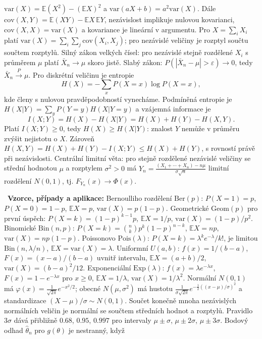 \begin{odpoved}
$\mathrm{var}(X)=\mathbb E(X^2)-(\mathbb EX)^2$ a
$\mathrm{var}(aX+b)=a^2\mathrm{var}(X)$. Dále
$\mathrm{cov}(X,Y)=\mathbb E(XY)-\mathbb EX\,\mathbb EY$, nezávislost implikuje nulovou
kovarianci, $\mathrm{cov}(X,X)=\mathrm{var}(X)$ a kovariance je lineární v argumentu.
Pro $X=\sum_iX_i$ platí
$\mathrm{var}(X)=\sum_i\sum_j\mathrm{cov}(X_i,X_j)$; pro nezávislé veličiny je rozptyl
součtu součtem rozptylů. Silný zákon velkých čísel: pro nezávislé stejně rozdělené
$X_i$ s průměrem $\mu$ platí $\bar X_n\to\mu$ skoro jistě. Slabý zákon:
$P(|\bar X_n-\mu|>\varepsilon)\to0$, tedy $\bar X_n\xrightarrow P\mu$. Pro diskrétní
veličinu je entropie
\[
H(X)=-\sum_x P(X=x)\log P(X=x),
\]
kde členy s nulovou pravděpodobností vynecháme. Podmíněná entropie je
$H(X|Y)=\sum_y P(Y=y)H(X|Y=y)$ a vzájemná informace je
\[
I(X;Y)=H(X)-H(X|Y)=H(X)+H(Y)-H(X,Y).
\]
Platí $I(X;Y)\ge0$, tedy $H(X)\ge H(X|Y)$: znalost $Y$ nemůže v průměru zvýšit
nejistotu o $X$. Zároveň $H(X,Y)=H(X)+H(Y)-I(X;Y)\le H(X)+H(Y)$, s rovností právě při
nezávislosti. Centrální limitní
věta: pro stejně rozdělené nezávislé veličiny se střední hodnotou $\mu$ a rozptylem
$\sigma^2>0$ má
$Y_n=\frac{(X_1+\cdots+X_n)-n\mu}{\sigma\sqrt n}$ limitní rozdělení $N(0,1)$, tj.
$F_{Y_n}(x)\to\Phi(x)$.\par
\noindent{}\ \textbf{Vzorce, případy a aplikace:} Bernoulliho rozdělení
$\mathrm{Ber}(p)$: $P(X=1)=p$, $P(X=0)=1-p$, $\mathbb EX=p$,
$\mathrm{var}(X)=p(1-p)$. Geometrické $\mathrm{Geom}(p)$ pro první úspěch:
$P(X=k)=(1-p)^{k-1}p$, $\mathbb EX=1/p$, $\mathrm{var}(X)=(1-p)/p^2$. Binomické
$\mathrm{Bin}(n,p)$: $P(X=k)=\binom nkp^k(1-p)^{n-k}$, $\mathbb EX=np$,
$\mathrm{var}(X)=np(1-p)$. Poissonovo $\mathrm{Pois}(\lambda)$:
$P(X=k)=\lambda^ke^{-\lambda}/k!$, je limitou $\mathrm{Bin}(n,\lambda/n)$,
$\mathbb EX=\mathrm{var}(X)=\lambda$. Uniformní $U(a,b)$:
$f(x)=1/(b-a)$, $F(x)=(x-a)/(b-a)$ uvnitř intervalu, $\mathbb EX=(a+b)/2$,
$\mathrm{var}(X)=(b-a)^2/12$. Exponenciální $\mathrm{Exp}(\lambda)$:
$f(x)=\lambda e^{-\lambda x}$, $F(x)=1-e^{-\lambda x}$ pro $x\ge0$,
$\mathbb EX=1/\lambda$, $\mathrm{var}(X)=1/\lambda^2$. Normální $N(0,1)$ má
$\varphi(x)=\frac1{\sqrt{2\pi}}e^{-x^2/2}$; obecné $N(\mu,\sigma^2)$ má hustotu
$\frac1{\sigma\sqrt{2\pi}}e^{-\frac12((x-\mu)/\sigma)^2}$ a standardizace
$(X-\mu)/\sigma\sim N(0,1)$. Součet konečně mnoha nezávislých normálních veličin je
normální se součtem středních hodnot a rozptylů. Pravidlo $3\sigma$ dává přibližně
$0.68$, $0.95$, $0.997$ pro intervaly $\mu\pm\sigma$, $\mu\pm2\sigma$, $\mu\pm3\sigma$.
Bodový odhad $\hat\theta_n$ pro $g(\theta)$ je nestranný, když

\end{odpoved}
